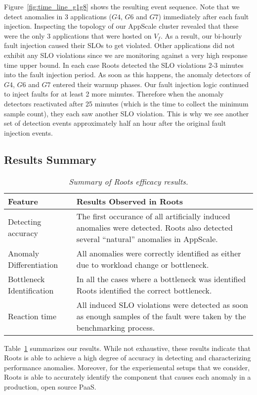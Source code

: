 Figure~\ref{fig:time_line_g1g8} shows the resulting event sequence. Note that we detect anomalies 
in 3 applications ($G4$, $G6$ and $G7$) immediately after each fault injection. Inspecting the 
topology of our AppScale cluster revealed that these were the only 3 applications that were 
hosted on $V_f$. As a result, our bi-hourly fault injection caused their SLOs to
get violated. Other applications did not exhibit any SLO violations since we are monitoring against
a very high response time upper bound. In each case Roots detected the SLO violations 2-3 minutes into the fault injection
period. As soon as this happens, the anomaly detectors of $G4$, $G6$ and $G7$ entered their warmup phases.
Our fault injection logic continued to inject faults for at least 2 more minutes. 
Therefore when the anomaly detectors
reactivated after 25 minutes (which is the time to collect the minimum sample count), they each saw another SLO
violation. This is why we see another set of detection events approximately half an hour after the
original fault injection events.

\subsection{Results Summary}

\begin{table}
{\footnotesize
\begin{center}
\begin{tabular}{|p{2cm}|p{6cm}|}
\hline
Feature & Results Observed in Roots \\ \hline
Detecting accuracy &
The first occurance of all artificially induced anomalies were detected.
Roots also detected several ``natural'' anomalies in AppScale. \\ \hline
Anomaly Differentiation &
All anomalies were correctly identified as either due to workload change or
bottleneck. \\ \hline
Bottleneck Identification &
In all the cases where a bottleneck was identified Roots identified the
correct bottleneck. \\ \hline
Reaction time &
All induced SLO violations were detected as soon
as enough samples of the fault
were taken by the benchmarking process. \\
\hline
\end{tabular}
\end{center}
}
\vspace{-0.2in}
\caption{\textit{Summary of Roots efficacy results.
\label{tab:results_summary}
}}
\vspace{-0.2in}
\end{table}
Table~\ref{tab:results_summary} summarizes our results.
While not exhaustive, these results indicate that Roots is able to achieve a
high degree of accuracy in detecting and characterizing performance anomalies.
Moreover, for the experiemental setups that we consider, Roots is able to accurately identify
the component that causes each anomaly in a production, open source PaaS.

